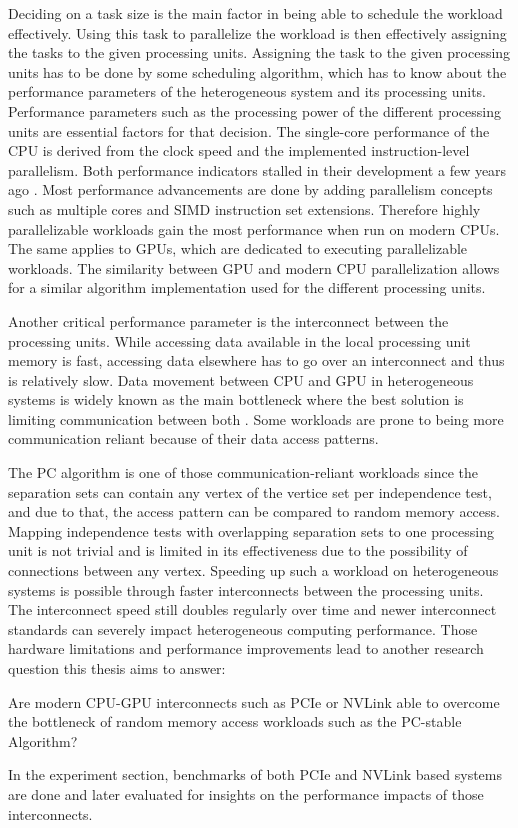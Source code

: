 Deciding on a task size is the main factor in being able to schedule the workload effectively. Using this task to parallelize the workload is then effectively assigning the tasks to the given processing units. Assigning the task to the given processing units has to be done by some scheduling algorithm, which has to know about the performance parameters of the heterogeneous system and its processing units.
Performance parameters such as the processing power of the different processing units are essential factors for that decision. The single-core performance of the CPU is derived from the clock speed and the implemented instruction-level parallelism. Both performance indicators stalled in their development a few years ago \cite{sutterFreeLunchFundamental2013}. Most performance advancements are done by adding parallelism concepts such as multiple cores and SIMD instruction set extensions. Therefore highly parallelizable workloads gain the most performance when run on modern CPUs. The same applies to GPUs, which are dedicated to executing parallelizable workloads.
The similarity between GPU and modern CPU parallelization allows for a similar algorithm implementation used for the different processing units.

Another critical performance parameter is the interconnect between the processing units. While accessing data available in the local processing unit memory is fast, accessing data elsewhere has to go over an interconnect and thus is relatively slow. Data movement between CPU and GPU in heterogeneous systems is widely known as the main bottleneck where the best solution is limiting communication between both \cite{hazarikaSurveyMemoryManagement2019}. Some workloads are prone to being more communication reliant because of their data access patterns.

The PC algorithm is one of those communication-reliant workloads since the separation sets can contain any vertex of the vertice set per independence test, and due to that, the access pattern can be compared to random memory access. Mapping independence tests with overlapping separation sets to one processing unit is not trivial and is limited in its effectiveness due to the possibility of connections between any vertex. Speeding up such a workload on heterogeneous systems is possible through faster interconnects between the processing units. The interconnect speed still doubles regularly over time \cite{NVLink2021} and newer interconnect standards can severely impact heterogeneous computing performance.
Those hardware limitations and performance improvements lead to another research question this thesis aims to answer:

Are modern CPU-GPU interconnects such as PCIe or NVLink able to overcome the bottleneck of random memory access workloads such as the PC-stable Algorithm?

In the experiment section, benchmarks of both PCIe and NVLink based systems are done and later evaluated for insights on the performance impacts of those interconnects.

